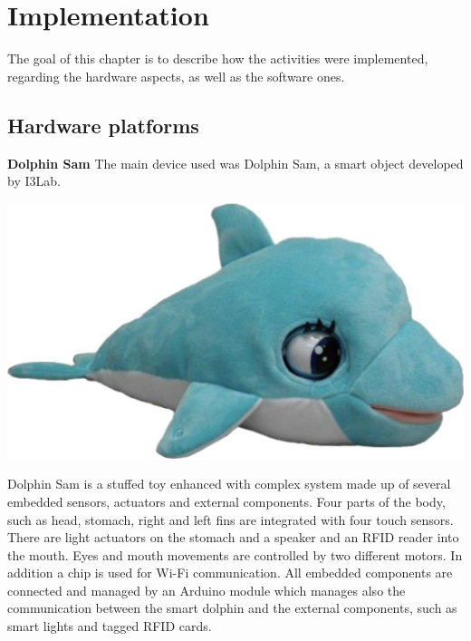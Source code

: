 	\chapter{Implementation}
	The goal of this chapter is to describe how the activities were implemented, regarding the hardware aspects, as well as the software ones.
	\section{Hardware platforms}
	{\textbf{\Large Dolphin Sam}} \newline \newline
	The main device used was Dolphin Sam, a smart object developed by I3Lab.
	\begin{center}
		\includegraphics[width=\textwidth]{images/Dolphin.jpg}
	\end{center}
	\noindent
	Dolphin Sam \cite{colombo_dolphin_2016} is a stuffed toy enhanced with complex system made	up of several embedded sensors, actuators and external components. Four parts of the body, such as head, stomach, right and left fins are integrated with four touch sensors. There are light actuators on the stomach and a speaker and an RFID reader into the mouth. Eyes and mouth movements are controlled by two different motors. In addition a chip is used for Wi-Fi communication. \newline
	All embedded components are connected and managed by an Arduino module which manages also the communication between the smart dolphin and the external components, such as smart lights and tagged RFID cards.
	
	
	
	

		
